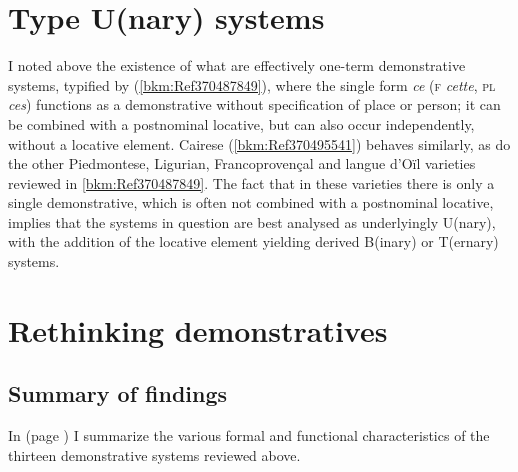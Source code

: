 \documentclass[output=paper]{langsci/langscibook}
\begin{document}
\section{Type U(nary) systems}\label{bkm:Ref370483115}

I noted above the existence of what are effectively one-term demonstrative
systems, typified by  (\cref{bkm:Ref370487849}), where the single form
\emph{ce} (\textsc{f} \emph{cette}, \textsc{pl} \emph{ces}) functions as a
demonstrative without specification of place or person; it can be combined with
a postnominal locative, but can also occur independently, without a locative
element. Cairese (\cref{bkm:Ref370495541}) behaves similarly, as do the
other Piedmontese, Ligurian, Francoprovençal and langue d’Oïl varieties
reviewed in \cref{bkm:Ref370487849}. The fact that in these varieties there
is only a single demonstrative, which is often not combined with a postnominal
locative, implies that the systems in question are best analysed as
underlyingly U(nary), with the addition of the locative element yielding
derived B(inary) or T(ernary) systems.

\section{Rethinking demonstratives}

\subsection{Summary of findings}

In  (page \pageref{tab:08.2}) I summarize the various formal and functional
characteristics of the thirteen demonstrative systems reviewed above.
\end{document}
